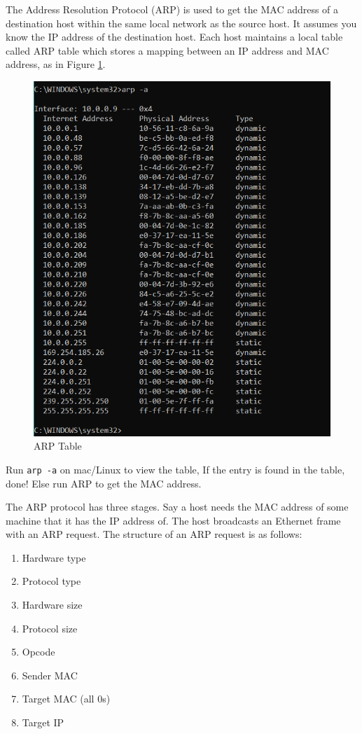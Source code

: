 The Address Resolution Protocol (ARP) is used to get the MAC
address of a destination host
within the same local network as the source host. It
assumes you know the IP address of the destination host.
Each host maintains a local table called ARP table
which stores a mapping between an IP address and MAC address,
as in Figure \ref{fig:arptable}.
\begin{figure}
    \includegraphics{images/arptable.png}
    \caption{ARP Table}
    \label{fig:arptable}
\end{figure}
Run \texttt{arp -a} on mac/Linux to view the table,
If the entry is found in the table, done!
Else run ARP to get the MAC address.

The ARP protocol has three stages. Say a host needs the MAC address
of some machine that it has the IP address of. The host broadcasts
an Ethernet frame with an ARP request. The structure of an ARP request
is as follows:
\begin{enumerate}
    \item Hardware type
    \item Protocol type
    \item Hardware size
    \item Protocol size
    \item Opcode
    \item Sender MAC
    \item Target MAC (all 0s)
    \item Target IP
\end{enumerate}

